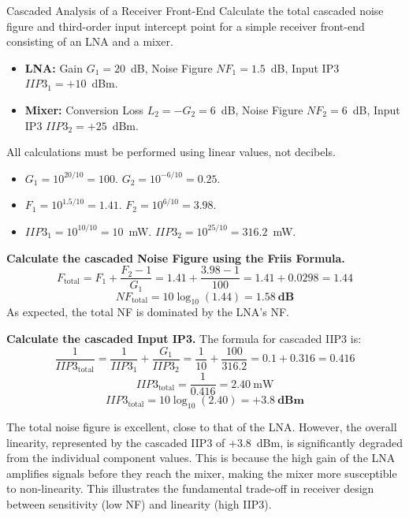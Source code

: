 \begin{workedexample}{Cascaded Analysis of a Receiver Front-End}
    Calculate the total cascaded noise figure and third-order input intercept point for a simple receiver front-end consisting of an LNA and a mixer.

    \begin{itemize}
        \item \textbf{LNA:} Gain \(G_1 = 20\)~dB, Noise Figure \(NF_1 = 1.5\)~dB, Input IP3 \(IIP3_1 = +10\)~dBm.
        \item \textbf{Mixer:} Conversion Loss \(L_2 = -G_2 = 6\)~dB, Noise Figure \(NF_2 = 6\)~dB, Input IP3 \(IIP3_2 = +25\)~dBm.
    \end{itemize}

    All calculations must be performed using linear values, not decibels.
    \begin{itemize}
        \item \(G_1 = 10^{20/10} = 100\). \(G_2 = 10^{-6/10} = 0.25\).
        \item \(F_1 = 10^{1.5/10} = 1.41\). \(F_2 = 10^{6/10} = 3.98\).
        \item \(IIP3_1 = 10^{10/10} = 10\)~mW. \(IIP3_2 = 10^{25/10} = 316.2\)~mW.
    \end{itemize}

    \begin{derivationsteps}
        \step \textbf{Calculate the cascaded Noise Figure using the Friis Formula.}
        \[ F_{\text{total}} = F_1 + \frac{F_2 - 1}{G_1} = 1.41 + \frac{3.98 - 1}{100} = 1.41 + 0.0298 = 1.44 \]
        \[ NF_{\text{total}} = 10\log_{10}(1.44) = \mathbf{1.58~\text{dB}} \]
        As expected, the total NF is dominated by the LNA's NF.

        \step \textbf{Calculate the cascaded Input IP3.} The formula for cascaded IIP3 is:
        \[ \frac{1}{IIP3_{\text{total}}} = \frac{1}{IIP3_1} + \frac{G_1}{IIP3_2} = \frac{1}{10} + \frac{100}{316.2} = 0.1 + 0.316 = 0.416 \]
        \[ IIP3_{\text{total}} = \frac{1}{0.416} = 2.40~\text{mW} \]
        \[ IIP3_{\text{total}} = 10\log_{10}(2.40) = \mathbf{+3.8~\text{dBm}} \]
    \end{derivationsteps}

    The total noise figure is excellent, close to that of the LNA. However, the overall linearity, represented by the cascaded IIP3 of +3.8~dBm, is significantly degraded from the individual component values. This is because the high gain of the LNA amplifies signals before they reach the mixer, making the mixer more susceptible to non-linearity. This illustrates the fundamental trade-off in receiver design between sensitivity (low NF) and linearity (high IIP3).
\end{workedexample}


